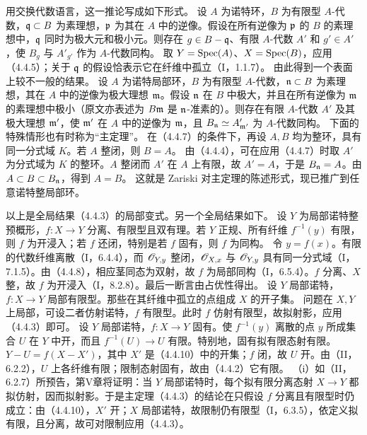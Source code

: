 用交换代数语言，这一推论写成如下形式。
设 $A$ 为诺特环，$B$ 为有限型 $A$-代数，$\mathfrak q\subset B$ 为素理想，$\mathfrak p$ 为其在 $A$ 中的逆像。假设在所有逆像为 $\mathfrak p$ 的 $B$ 的素理想中，$\mathfrak q$ 同时为极大元和极小元。则存在 $g\in B-\mathfrak q$、有限 $A$-代数 $A'$ 和 $g'\in A'$，使 $B_g$ 与 $A'_{g'}$ 作为 $A$-代数同构。
\eproof
取 $Y=\operatorname{Spec}(A)$、$X=\operatorname{Spec}(B)$，应用（4.4.5）；关于 $\mathfrak q$ 的假设恰表示它在纤维中孤立（I，1.1.7）。\finishproof
由此得到一个表面上较不一般的结果。
设 $A$ 为诺特局部环，$B$ 为有限型 $A$-代数，$\mathfrak n\subset B$ 为素理想，其在 $A$ 中的逆像为极大理想 $\mathfrak m$。假设 $\mathfrak n$ 在 $B$ 中极大，并且在所有逆像为 $\mathfrak m$ 的素理想中极小（原文亦表述为 $B\mathfrak m$ 是 $\mathfrak n$-准素的）。则存在有限 $A$-代数 $A'$ 及其极大理想 $\mathfrak m'$，使 $\mathfrak m'$ 在 $A$ 中的逆像为 $\mathfrak m$，且 $B_{\mathfrak n}\simeq A'_{\mathfrak m'}$ 为 $A$-代数同构。
下面的特殊情形也有时称为“主定理”。
在（4.4.7）的条件下，再设 $A,B$ 均为整环，具有同一分式域 $K$。若 $A$ 整闭，则 $B=A$。
\eproof
由（4.4.4），可在应用（4.4.7）时取 $A'$ 为分式域为 $K$ 的整环。$A$ 整闭而 $A'$ 在 $A$ 上有限，故 $A'=A$，于是 $B_{\mathfrak n}=A$。由 $A\subset B\subset B_{\mathfrak n}$，得到 $A=B$。\finishproof
这就是 Zariski 对主定理的陈述形式，现已推广到任意诺特整局部环。

以上是全局结果（4.4.3）的局部变式。另一个全局结果如下。
设 $Y$ 为局部诺特整预概形，$f:X\to Y$ 分离、有限型且双有理。若 $Y$ 正规、所有纤维 $f^{-1}(y)$ 有限，则 $f$ 为开浸入；若 $f$ 还闭，特别是若 $f$ 固有，则 $f$ 为同构。
\eproof
令 $y=f(x)$。有限的代数纤维离散（I，6.4.4），而 $\mathscr O_{Y,y}$ 整闭，$\mathscr O_{X,x}$ 与 $\mathscr O_{Y,y}$ 具有同一分式域（I，7.1.5）。由（4.4.8），相应茎同态为双射，故 $f$ 为局部同构（I，6.5.4）。$f$ 分离、$X$ 整，故 $f$ 为开浸入（I，8.2.8）。最后一断言由占优性得出。\finishproof
{}
设 $Y$ 局部诺特，$f:X\to Y$ 局部有限型。那些在其纤维中孤立的点组成 $X$ 的开子集。
\eproof
问题在 $X,Y$ 上局部，可设二者仿射诺特，$f$ 有限型。此时 $f$ 仿射有限型，故拟射影，应用（4.4.3）即可。\finishproof
{}
设 $Y$ 局部诺特，$f:X\to Y$ 固有。使 $f^{-1}(y)$ 离散的点 $y$ 所成集合 $U$ 在 $Y$ 中开，而且 $f^{-1}(U)\to U$ 有限。特别地，固有拟有限态射有限。
\eproof
$Y-U=f(X-X')$，其中 $X'$ 是（4.4.10）中的开集；$f$ 闭，故 $U$ 开。由（II，6.2.2），$U$ 上各纤维有限；限制态射固有，故由（4.4.2）它有限。\finishproof
{}
（i）如（II，6.2.7）所预告，第V章将证明：当 $Y$ 局部诺特时，每个拟有限分离态射 $X\to Y$ 都拟仿射，因而拟射影。于是主定理（4.4.3）的结论在只假设 $f$ 分离且有限型时仍成立：由（4.4.10），$X'$ 开；$X$ 局部诺特，故限制仍有限型（I，6.3.5），依定义拟有限，且分离，故可对限制应用（4.4.3）。

